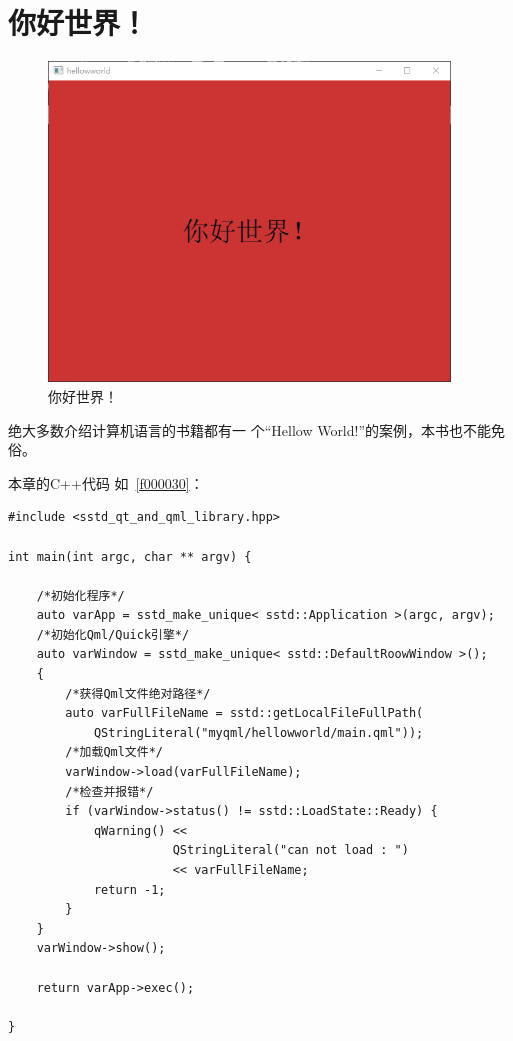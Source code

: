 ﻿





\FloatBarrier
\section{
你好世界！
}\label{s100410}



\begin{figure}[htb] %
\centering %
\includegraphics[width=0.95\textwidth]{../chapter01/hellowworld/the_app.png} %
\caption{你好世界！} %
\label{p000006} %
\end{figure}


绝大多数介绍计算机语言的书籍都有一
个“Hellow World!”的案例，本书也不能免俗。

本章的C{\sourcefonttwo{}+}{\sourcefonttwo{}+}代码
如\lstlistingname\ \ref{f000030}：

\FloatBarrier
\begin{lstlisting}[label=f000030,
caption=GoodLuck,
title=\lstlistingname\ \thelstlisting
]
#include <sstd_qt_and_qml_library.hpp>

int main(int argc, char ** argv) {

    /*初始化程序*/
    auto varApp = sstd_make_unique< sstd::Application >(argc, argv);
    /*初始化Qml/Quick引擎*/
    auto varWindow = sstd_make_unique< sstd::DefaultRoowWindow >();
    {
        /*获得Qml文件绝对路径*/
        auto varFullFileName = sstd::getLocalFileFullPath(
            QStringLiteral("myqml/hellowworld/main.qml"));
        /*加载Qml文件*/
        varWindow->load(varFullFileName);
        /*检查并报错*/
        if (varWindow->status() != sstd::LoadState::Ready) {
            qWarning() <<
                       QStringLiteral("can not load : ")
                       << varFullFileName;
            return -1;
        }
    }
    varWindow->show();

    return varApp->exec();

}
\end{lstlisting}          %


